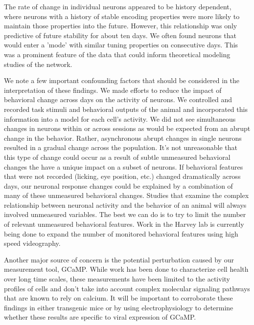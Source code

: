 The rate of change in individual neurons appeared to be history dependent, where neurons with a history of stable encoding properties were more likely to maintain those properties into the future. However, this relationship was only predictive of future stability for about ten days. We often found neurons that would enter a 'mode' with similar tuning properties on consecutive days. This was a prominent feature of the data that could inform theoretical modeling studies of the network.

\bigskip

We note a few important confounding factors that should be considered in the interpretation of these findings. We made efforts to reduce the impact of behavioral change across days on the activity of neurons. We controlled and recorded task stimuli and behavioral outputs of the animal and incorporated this information into a model for each cell's activity. We did not see simultaneous changes in neurons within or across sessions as would be expected from an abrupt change in the behavior. Rather, asynchronous abrupt changes in single neurons resulted in a gradual change across the population. It's not unreasonable that this type of change could occur as a result of subtle unmeasured behavioral changes the have a unique impact on a subset of neurons. If behavioral features that were not recorded (licking, eye position, etc.) changed dramatically across days, our neuronal response changes could be explained by a combination of many of these unmeasured behavioral changes. Studies that examine the complex relationship between neuronal activity and the behavior of an animal will always involved unmeasured variables. The best we can do is to try to limit the number of relevant unmeasured behavioral features. Work in the Harvey lab is currently being done to expand the number of monitored behavioral features using high speed videography.

\bigskip

Another major source of concern is the potential perturbation caused by our measurement tool, GCaMP. While work has been done to characterize cell health over long time scales, these measurements have been limited to the activity profiles of cells and don't take into account complex molecular signaling pathways that are known to rely on calcium. It will be important to corroborate these findings in either transgenic mice or by using electrophysiology to determine whether these results are specific to viral expression of GCaMP.

\bigskip

